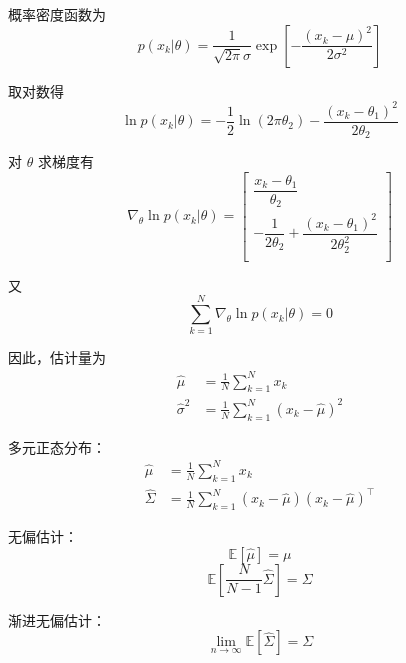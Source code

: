 \documentclass[openany]{ctexbook}
\theoremstyle{kaiti}
\theoremstyle{normal}
\begin{document}
概率密度函数为
\begin{equation}
p(x_k|\theta)=\frac{1}{\sqrt{2\pi}\sigma}\exp \left[-\frac{(x_k-\mu)^2}{2\sigma^2} \right]
\end{equation}

取对数得
\begin{equation}
\ln p(x_k|\theta)=-\frac{1}{2}\ln \left(2\pi \theta_2 \right)-\frac{\left(x_k-\theta_1 \right)^2}{2\theta_2}
\end{equation}

对 $\theta$ 求梯度有
\begin{equation}
\nabla_{\theta}\ln p(x_k|\theta)
=\begin{bmatrix}
  \dfrac{x_k-\theta_1}{\theta_2}\\ 
  -\dfrac{1}{2\theta_2}+\dfrac{\left(x_k-\theta_1 \right)^2}{2\theta_{2}^{2}}\\
\end{bmatrix}
\end{equation}

又
\begin{equation}
\sum_{k=1}^N{\nabla_{\theta}\ln p(x_k|\theta)}=0
\end{equation}

因此，估计量为
\begin{equation}
\begin{aligned}
  \hat{\mu}&=\frac{1}{N}\sum_{k=1}^N{x_k} \\
  \hat{\sigma}^2&=\frac{1}{N}\sum_{k=1}^N{\left(x_k-\hat{\mu} \right)^2}
\end{aligned}
\end{equation}

多元正态分布：
\begin{equation}
\begin{aligned}
  \hat{\mu}&=\frac{1}{N}\sum_{k=1}^N{x_k}\\
  \hat{\Sigma}&=\frac{1}{N}\sum_{k=1}^N{\left(x_k-\hat{\mu} \right)\left(x_k-\hat{\mu} \right)^{\top}}
\end{aligned}
\end{equation}

无偏估计：
\begin{equation}
\mathbb{E} \left[\hat{\mu} \right] =\mu
\end{equation}
\begin{equation}
\mathbb{E} \left[\frac{N}{N-1}\hat{\Sigma}\right] =\Sigma
\end{equation}

渐进无偏估计：
\begin{equation}
\lim_{n\rightarrow \infty} \mathbb{E} \left[\hat{\Sigma} \right] =\Sigma
\end{equation}
\end{document}
